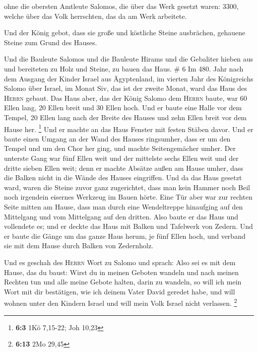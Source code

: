  ohne die obersten Amtleute Salomos, die über das Werk
gesetzt waren: 3300, welche über das Volk herrschten, das da am Werk
arbeitete.

 Und der König gebot, dass sie große und köstliche Steine
ausbrächen, gehauene Steine zum Grund des Hauses.

 Und die Bauleute Salomos und die Bauleute Hirams und die
Gebaliter hieben aus und bereiteten zu Holz und Steine, zu bauen das
Haus. \# 6  Im 480. Jahr nach dem Ausgang der Kinder
Israel aus Ägyptenland, im vierten Jahr des Königreichs Salomo über
Israel, im Monat Siv, das ist der zweite Monat, ward das Haus des
\textsc{Herrn} gebaut.  Das Haus aber, das der König
Salomo dem \textsc{Herrn} baute, war 60 Ellen lang, 20 Ellen breit und
30 Ellen hoch.  Und er baute eine Halle vor dem Tempel, 20
Ellen lang nach der Breite des Hauses und zehn Ellen breit vor dem Hause
her. \footnote{\textbf{6:3} 1Kö 7,15-22; Joh 10,23}  Und
er machte an das Haus Fenster mit festen Stäben davor. 
Und er baute einen Umgang an der Wand des Hauses ringsumher, dass er um
den Tempel und um den Chor her ging, und machte Seitengemächer umher.
 Der unterste Gang war fünf Ellen weit und der mittelste
sechs Ellen weit und der dritte sieben Ellen weit; denn er machte
Absätze außen am Hause umher, dass die Balken nicht in die Wände des
Hauses eingriffen.  Und da das Haus gesetzt ward, waren
die Steine zuvor ganz zugerichtet, dass man kein Hammer noch Beil noch
irgendein eisernes Werkzeug im Bauen hörte.  Eine Tür aber
war zur rechten Seite mitten am Hause, dass man durch eine Wendeltreppe
hinaufging auf den Mittelgang und vom Mittelgang auf den dritten.
 Also baute er das Haus und vollendete es; und er deckte
das Haus mit Balken und Tafelwerk von Zedern.  Und er
baute die Gänge um das ganze Haus herum, je fünf Ellen hoch, und verband
sie mit dem Hause durch Balken von Zedernholz.

 Und es geschah des \textsc{Herrn} Wort zu Salomo und
sprach:  Also sei es mit dem Hause, das du baust: Wirst
du in meinen Geboten wandeln und nach meinen Rechten tun und alle meine
Gebote halten, darin zu wandeln, so will ich mein Wort mit dir
bestätigen, wie ich deinem Vater David geredet habe,  und
will wohnen unter den Kindern Israel und will mein Volk Israel nicht
verlassen. \footnote{\textbf{6:13} 2Mo 29,45}

